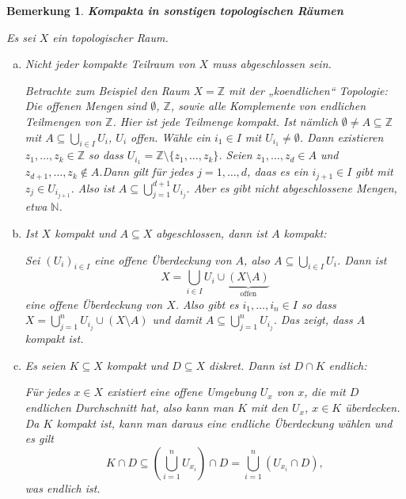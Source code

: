 \documentclass[12pt]{scrbook}   %
\newtheorem{bemX}[alles]{Bemerkung}
\newenvironment{bem}[1]{\begin{bemX}{\bf #1}\par\rm}{\end{bemX}}
\begin{document}
\begin{bem}{Kompakta in sonstigen topologischen Räumen}
Es sei $X$ ein topologischer Raum.
\begin{enumerate}[a)]
\item Nicht jeder kompakte Teilraum von $X$ muss abgeschlossen sein.

Betrachte zum Beispiel den Raum $X=\mathbb Z$ mit der „koendlichen“ Topologie: Die offenen Mengen sind $\emptyset$, $\mathbb Z$, sowie alle Komplemente von endlichen Teilmengen von $\mathbb Z$. Hier ist jede Teilmenge kompakt. Ist nämlich $\emptyset \ne A\subseteq \mathbb Z$ mit $A\subseteq \bigcup_{i\in I} U_i$, $U_i$ offen. Wähle ein $i_1 \in I$ mit $U_{i_1} \ne \emptyset$. Dann existieren $z_1,\ldots, z_k\in \mathbb Z$ so dass $U_{i_1} =\mathbb Z\setminus \{z_1,\ldots, z_k\}$. Seien $z_1,\ldots,z_d\in A$ und $z_{d+1},\ldots,z_k\notin A$.Dann gilt für jedes $j=1,\ldots,d$, daas es ein $i_{j+1}\in I$ gibt mit $z_j\in U_{i_{j+1}}$. Also ist $A\subseteq \bigcup_{j=1}^{d+1} U_{i_j}$. Aber es gibt nicht abgeschlossene Mengen, etwa $\mathbb N$. 

\item Ist $X$ kompakt und $A\subseteq X$ abgeschlossen, dann ist $A$ kompakt:

Sei $(U_i)_{i\in I}$ eine offene Überdeckung von $A$, also $A\subseteq \bigcup_{i\in I} U_i$. Dann ist 
$$ X = \bigcup_{i\in I} U_i \cup \underbrace{(X\setminus A)}_{\text{offen}} $$
eine offene Überdeckung von $X$. Also gibt es $i_1,\ldots,i_n \in I$ so dass $X= \bigcup_{j=1}^n U_{i_j} \cup (X\setminus A)$ und damit $A \subseteq \bigcup_{j=1}^n U_{i_j} $. Das zeigt, dass $A$ kompakt ist.

\item Es seien $K\subseteq X$ kompakt und $D\subseteq X$ diskret. Dann ist $D\cap K$ endlich:

Für jedes $x\in X$ existiert eine offene Umgebung $U_x$ von $x$, die mit $D$ endlichen Durchschnitt hat, also kann man $K$ mit den $U_x$, $x\in K$ überdecken. Da $K$ kompakt ist, kann man daraus eine endliche Überdeckung wählen und es gilt
$$ K\cap D \subseteq (\bigcup _{i=1}^n U_{x_i}) \cap D = \bigcup _{i=1}^n (U_{x_i} \cap D ),$$
was endlich ist.
\end{enumerate}
\end{bem}
\end{document}
